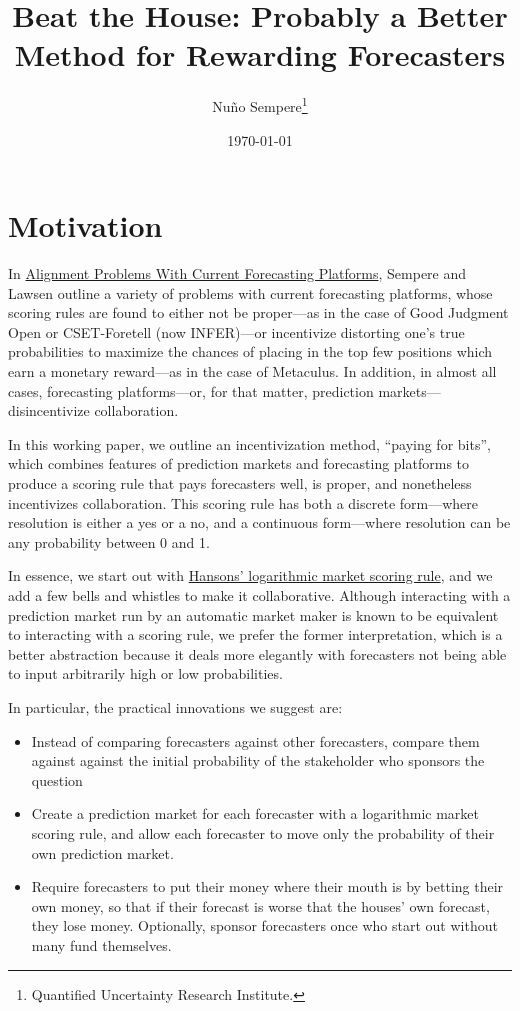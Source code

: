\documentclass[]{article}
\title{Beat the House: Probably a Better Method for Rewarding Forecasters}
\author{Nuño Sempere\footnote{Quantified Uncertainty Research Institute.}}
\date{\today}
\providecommand{\tightlist}{%
  \setlength{\itemsep}{0pt}\setlength{\parskip}{0pt}}
\begin{document}
\maketitle

\hypertarget{motivation}{%
\section{Motivation}\label{motivation}}

In \href{https://arxiv.org/abs/2106.11248}{Alignment Problems With
Current Forecasting Platforms}, Sempere and Lawsen outline a variety of
problems with current forecasting platforms, whose scoring rules are
found to either not be proper---as in the case of Good Judgment Open or
CSET-Foretell (now INFER)---or incentivize distorting one's true
probabilities to maximize the chances of placing in the top few
positions which earn a monetary reward---as in the case of Metaculus. In
addition, in almost all cases, forecasting platforms---or, for that
matter, prediction markets---disincentivize collaboration.

In this working paper, we outline an incentivization method, ``paying
for bits'', which combines features of prediction markets and
forecasting platforms to produce a scoring rule that pays forecasters
well, is proper, and nonetheless incentivizes collaboration. This
scoring rule has both a discrete form---where resolution is either a yes
or a no, and a continuous form---where resolution can be any probability
between 0 and 1.

In essence, we start out with
\href{https://mason.gmu.edu/~rhanson/mktscore.pdf}{Hansons' logarithmic
market scoring rule}, and we add a few bells and whistles to make it
collaborative. Although interacting with a prediction market run by an
automatic market maker is known to be equivalent to interacting with a
scoring rule, we prefer the former interpretation, which is a better
abstraction because it deals more elegantly with forecasters not being
able to input arbitrarily high or low probabilities.

In particular, the practical innovations we suggest are:

\begin{itemize}
\tightlist
\item
  Instead of comparing forecasters against other forecasters, compare
  them against against the initial probability of the stakeholder who
  sponsors the question
\item
  Create a prediction market for each forecaster with a logarithmic
  market scoring rule, and allow each forecaster to move only the
  probability of their own prediction market.
\item
  Require forecasters to put their money where their mouth is by betting
  their own money, so that if their forecast is worse that the houses'
  own forecast, they lose money. Optionally, sponsor forecasters once
  who start out without many fund themselves.
\end{itemize}
\end{document}

